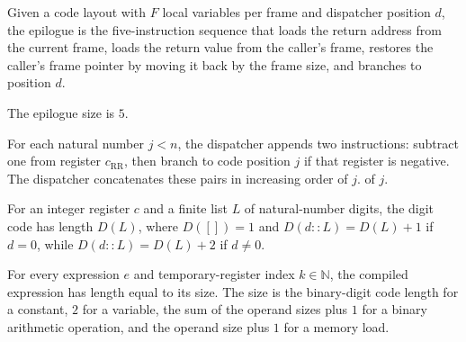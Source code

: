 \begin{definition}
\label{Light.Compiler.epilogue}
\leanok
{}
Given a code layout with $F$ local variables per frame and dispatcher position $d$, the
epilogue is the five-instruction sequence that loads the return address from the current
frame, loads the return value from the caller's frame, restores the caller's frame
pointer by moving it back by the frame size, and branches to position $d$.
\end{definition}

\begin{definition}
\label{Light.Compiler.epilogueSize}
\leanok
The epilogue size is $5$.
\end{definition}

\begin{definition}
\label{Light.Compiler.dispatcher}
\leanok
{}
For each natural number $j<n$, the dispatcher appends two instructions: subtract one
from register $c_{\mathrm{RR}}$, then branch to code position $j$ if that register is
negative. The dispatcher concatenates these pairs in increasing order of $j$.
of $j$.
\end{definition}

\begin{theorem}
\label{Light.Compiler.length_digitsCode}
\leanok
{}
For an integer register $c$ and a finite list $L$ of natural-number digits, the digit
code has length $D(L)$, where $D([])=1$ and $D(d::L)=D(L)+1$ if $d=0$, while
$D(d::L)=D(L)+2$ if $d\ne0$.
\end{theorem}

\begin{theorem}
\label{Light.Compiler.length_compileExpr}
\leanok
{}
For every expression $e$ and temporary-register index $k\in\mathbb N$, the compiled
expression has length equal to its size. The size is the binary-digit code length for a
constant, $2$ for a variable, the sum of the operand sizes plus $1$ for a binary
arithmetic operation, and the operand size plus $1$ for a memory load.
\end{theorem}

